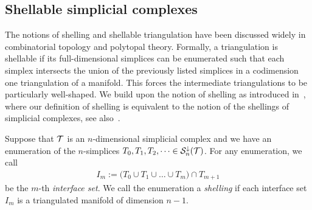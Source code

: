 \documentclass[10pt,letterpaper]{article}
\newcommand\cye[1]{%
  \protect\leavevmode
  \begingroup
    \color{red!35!yellow}%
    #1%
  \endgroup
}
\begin{document}
% 
% 


\subsection{Shellable simplicial complexes}\label{section:shellability}


The notions of shelling and shellable triangulation have been discussed widely in combinatorial topology and polytopal theory. 
Formally, a triangulation is shellable if its full-dimensional simplices can be enumerated such that each simplex intersects the union of the previously listed simplices in a codimension one triangulation of a manifold. 
This forces the intermediate triangulations to be particularly well-shaped. 
We build upon the notion of shelling as introduced in~\cite[Definition 8.1]{ziegler1995lectures},
where our definition of shelling is equivalent to the notion of the shellings of simplicial complexes, see also~\cite[Remark~8.3]{ziegler1995lectures}. 



Suppose that ${\mathcal T}$ is an $n$-dimensional simplicial complex and we have an enumeration of the $n$-simplices $T_{0}, T_{1}, T_{2}, \dots \in {\mathcal S}^{\downarrow}_{n}({\mathcal T})$.
For any enumeration, we call 
\begin{align*}
    I_m 
    := 
    \big( 
        T_{0} \cup T_{1} \cup \dots \cup T_{m} 
    \big) 
    \cap 
    T_{m+1}
\end{align*}
be the $m$-th \textit{interface set}. 
We call the enumeration a \emph{shelling} if each interface \cye{set} $I_m$ is a \cye{triangulated} manifold of dimension $n-1$. 
\end{document}
